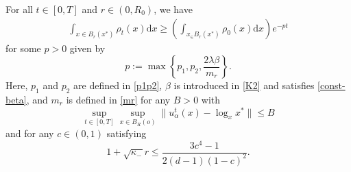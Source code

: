 \documentclass[10pt,a4paper]{amsart}
\def\d{\mathrm{d}}
\newcommand{\p}{o}%
\begin{document}
\begin{proposition}\label{prop: positive mass}
For all $t\in [0,T]$ and $r\in (0,R_0)$, we have
\begin{align*}
\int_{ x\in B_r(x^*)} \rho_t(x) \d x \geq  \left(\int_{x_\in B_r(x^*)} \rho_0(x) \d x\right) e^{-pt}
\end{align*}
for some $p>0$ given by
\[
p:= \max\left\{  p_1,p_2,\frac{2\lambda\beta}{m_r} \right\}.
\]
Here, $p_1$ and $p_2$ are defined in \eqref{p1p2}, $\beta$ is introduced in \eqref{K2} and satisfies  \eqref{const-beta}, and $m_r$ is defined in \eqref{mr}   for any $B>0$ with 
\[
\sup_{t\in [0,T]} \sup_{x\in B_R(\p)}\|u_\alpha^t(x) - \log_xx^*\|\leq B
\]
and for any $c\in (0,1)$ satisfying
\[
1+\sqrt{\kappa_-} r \leq \frac{3c^4-1}{2(d-1)(1-c)^2}.
\]


\end{proposition}
\end{document}
